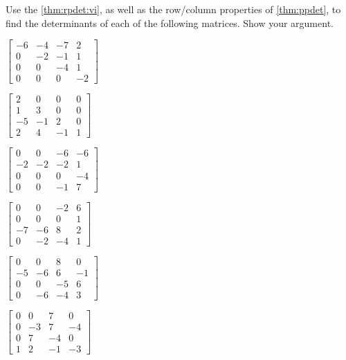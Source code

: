 \begin{exercise}  
Use the  \cref{thm:rpdet:vi}, as well as the row\slash column properties of \cref{thm:ppdet}, to find the determinants of each of the following matrices.
Show your argument.
\begin{Parts}
\item \(\begin{bmatrix} -6 & -4 & -7 & 2
\\0 & -2 & -1 & 1
\\0 & 0 & -4 & 1
\\0 & 0 & 0 & -2 \end{bmatrix}\)

\item \(\begin{bmatrix} 2 & 0 & 0 & 0
\\1 & 3 & 0 & 0
\\-5 & -1 & 2 & 0
\\2 & 4 & -1 & 1 \end{bmatrix}\)

\begin{OmitV1}
\item \(\begin{bmatrix} 0 & 0 & -6 & -6
\\-2 & -2 & -2 & 1
\\0 & 0 & 0 & -4
\\0 & 0 & -1 & 7 \end{bmatrix}\)

\item \(\begin{bmatrix} 0 & 0 & -2 & 6
\\0 & 0 & 0 & 1
\\-7 & -6 & 8 & 2
\\0 & -2 & -4 & 1 \end{bmatrix}\)
\end{OmitV1}

\item \(\begin{bmatrix} 0 & 0 & 8 & 0
\\-5 & -6 & 6 & -1
\\0 & 0 & -5 & 6
\\0 & -6 & -4 & 3 \end{bmatrix}\)

\item \(\begin{bmatrix} 0 & 0 & 7 & 0
\\0 & -3 & 7 & -4
\\0 & 7 & -4 & 0
\\1 & 2 & -1 & -3 \end{bmatrix}\)


\end{Parts}
\end{exercise}
